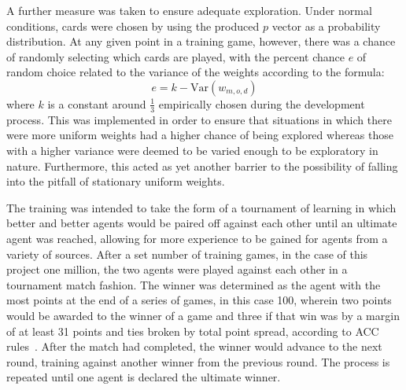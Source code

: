\newcommand{\Var}{\mathrm{Var}}
A further measure was taken to ensure adequate exploration.
%
Under normal conditions,
cards were chosen by using the produced $p$ vector as a probability
distribution.
%
At any given point in a training game, however,
there was a chance of randomly selecting which cards are played,
with the percent chance $e$ of random choice related to the variance of the 
weights according to the formula:
\[
	e = k - \Var(w_{m,o,d})
\]
where $k$ is a constant around $\frac{1}{3}$ empirically chosen during the
development process.
%
This was implemented in order to ensure that situations in which there were
more uniform weights had a higher chance of being explored
whereas those with a higher variance were deemed to be varied enough to be
exploratory in nature.
%
Furthermore, this acted as yet another barrier to the possibility of falling
into the pitfall of stationary uniform weights.

The training was intended to take the form of a tournament of learning in which
better and better agents would be paired off against each other until an
ultimate agent was reached,
allowing for more experience to be gained for agents from a variety of sources.
%
After a set number of training games,
in the case of this project one million,
the two agents were played against each other in a tournament match fashion.
%
The winner was determined as the agent with the most points at the end
of a series of games, %
in this case 100, %
wherein two points would be awarded to the winner of a game and three if that
win was by a margin of at least 31 points
and ties broken by total point spread,
according to ACC rules~\cite{ACC_rules}.
%
After the match had completed,
the winner would advance to the next round,
training against another winner from the previous round.
The process is
repeated until one agent is declared the ultimate winner.

